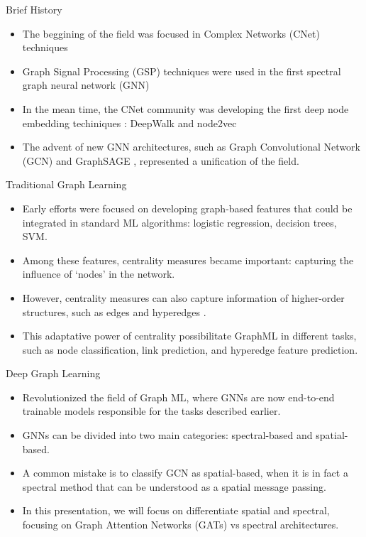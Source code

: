 \begin{frame}{Brief History}
    \begin{itemize}
        \item The beggining of the field was focused in Complex Networks (CNet) techniques \cite{costa2007characterization, silva2016machine}
        \item Graph Signal Processing (GSP) techniques were used in the first spectral graph neural network (GNN) \cite{bruna2013spectral}
        \item In the mean time, the CNet community was developing the first deep node embedding techiniques : DeepWalk \cite{perozzi2014deepwalk} and node2vec \cite{grover2016node2vec}
        \item The advent of new GNN architectures, such as Graph Convolutional Network (GCN) \cite{kipf2016semi} and GraphSAGE \cite{hamilton2017inductive}, represented a unification of the field.
    \end{itemize}
\end{frame}

\begin{frame}{Traditional Graph Learning}
    \begin{itemize}
        \item Early efforts were focused on developing graph-based features that could be integrated in standard ML algorithms: logistic regression, decision trees, SVM.
        \item Among these features, centrality measures became important: capturing the influence of `nodes' \cite{bonacich1987power} in the network.
        \item However, centrality measures can also capture information of higher-order structures, such as edges \cite{Lu2013edgebetw} and hyperedges \cite{tudisco2021hyperedge}.
        \item This adaptative power of centrality possibilitate GraphML in different tasks, such as node classification, link prediction, and hyperedge feature prediction.
    \end{itemize}
\end{frame}

\begin{frame}{Deep Graph Learning}
    \begin{itemize}
        \item Revolutionized the field of Graph ML, where GNNs are now end-to-end trainable models responsible for the tasks described earlier.
        \item GNNs can be divided into two main categories: spectral-based and spatial-based.
        \item A common mistake is to classify GCN as spatial-based, when it is in fact a spectral method that can be understood as a spatial message passing.
        \item In this presentation, we will focus on differentiate spatial and spectral, focusing on  Graph Attention Networks (GATs) vs spectral architectures.
    \end{itemize}
\end{frame}


